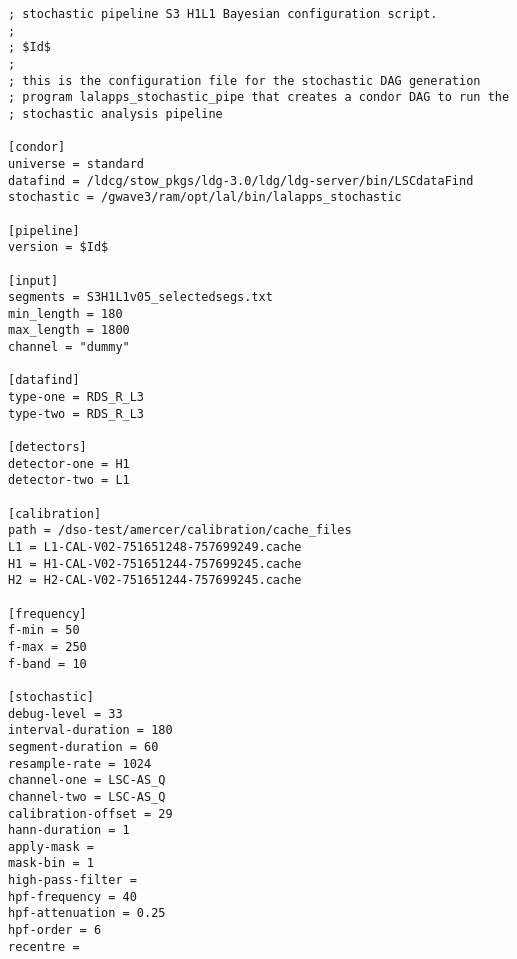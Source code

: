 \begin{verbatim}
; stochastic pipeline S3 H1L1 Bayesian configuration script.
; 
; $Id$
;
; this is the configuration file for the stochastic DAG generation
; program lalapps_stochastic_pipe that creates a condor DAG to run the
; stochastic analysis pipeline

[condor]
universe = standard
datafind = /ldcg/stow_pkgs/ldg-3.0/ldg/ldg-server/bin/LSCdataFind
stochastic = /gwave3/ram/opt/lal/bin/lalapps_stochastic

[pipeline]
version = $Id$

[input]
segments = S3H1L1v05_selectedsegs.txt
min_length = 180
max_length = 1800
channel = "dummy"

[datafind]
type-one = RDS_R_L3
type-two = RDS_R_L3

[detectors]
detector-one = H1
detector-two = L1

[calibration]
path = /dso-test/amercer/calibration/cache_files
L1 = L1-CAL-V02-751651248-757699249.cache
H1 = H1-CAL-V02-751651244-757699245.cache
H2 = H2-CAL-V02-751651244-757699245.cache

[frequency]
f-min = 50
f-max = 250
f-band = 10

[stochastic]
debug-level = 33
interval-duration = 180
segment-duration = 60
resample-rate = 1024
channel-one = LSC-AS_Q
channel-two = LSC-AS_Q
calibration-offset = 29
hann-duration = 1
apply-mask =
mask-bin = 1
high-pass-filter =
hpf-frequency = 40
hpf-attenuation = 0.25
hpf-order = 6
recentre =
\end{verbatim}
